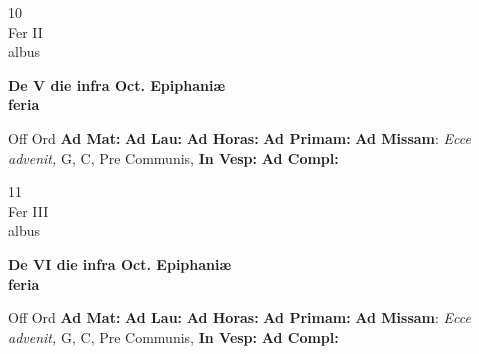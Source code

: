 \documentclass[10pt, openany]{book}
\begin{document}
        \begin{center}
            \begin{minipage}{3.5in}
                \vspace{2em}
                \begin{minipage}{0.5in}
                    {\Huge 10} \\
                    {\normalsize Fer II} \\
                    {\normalsize albus}
                \end{minipage}
                \begin{minipage}{3.0in}
                    \textbf{ \large De V die infra Oct. Epiphaniæ \\
                    \textnormal{\normalsize feria}} \\ 
                \end{minipage}
                \begin{justify}Off Ord
                    \textbf{Ad Mat: }
                    \textbf{Ad Lau: }
                    \textbf{Ad Horas: }
                    \textbf{Ad Primam: }\textbf{Ad Missam}: \textit{Ecce advenit,} G, C, Pre Communis,  
                    \textbf{In Vesp: }
                    \textbf{Ad Compl: }
                \end{justify}
            \end{minipage}
        \end{center}
    
        \begin{center}
            \begin{minipage}{3.5in}
                \vspace{2em}
                \begin{minipage}{0.5in}
                    {\Huge 11} \\
                    {\normalsize Fer III} \\
                    {\normalsize albus}
                \end{minipage}
                \begin{minipage}{3.0in}
                    \textbf{ \large De VI die infra Oct. Epiphaniæ \\
                    \textnormal{\normalsize feria}} \\ 
                \end{minipage}
                \begin{justify}Off Ord
                    \textbf{Ad Mat: }
                    \textbf{Ad Lau: }
                    \textbf{Ad Horas: }
                    \textbf{Ad Primam: }\textbf{Ad Missam}: \textit{Ecce advenit,} G, C, Pre Communis,  
                    \textbf{In Vesp: }
                    \textbf{Ad Compl: }
                \end{justify}
            \end{minipage}
        \end{center}
    
\end{document}
